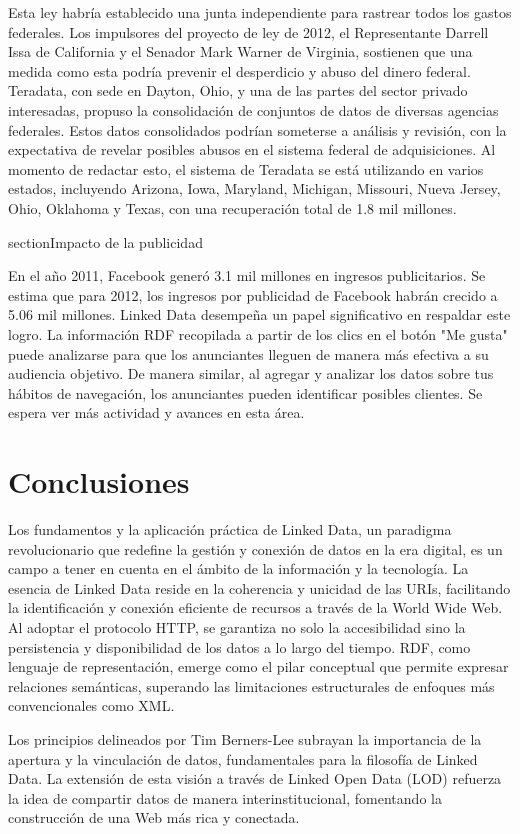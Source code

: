 \documentclass[11pt]{report}
\begin{document}
        Esta ley habría establecido una junta independiente para rastrear todos los gastos federales. Los impulsores del proyecto de ley de 2012, el Representante Darrell Issa de California y el Senador Mark Warner de Virginia, sostienen que una medida como esta podría prevenir el desperdicio y abuso del dinero federal. Teradata, con sede en Dayton, Ohio, y una de las partes del sector privado interesadas, propuso la consolidación de conjuntos de datos de diversas agencias federales. Estos datos consolidados podrían someterse a análisis y revisión, con la expectativa de revelar posibles abusos en el sistema federal de adquisiciones. Al momento de redactar esto, el sistema de Teradata se está utilizando en varios estados, incluyendo Arizona, Iowa, Maryland, Michigan, Missouri, Nueva Jersey, Ohio, Oklahoma y Texas, con una recuperación total de 1.8 mil millones.

section{Impacto de la publicidad}

		En el año 2011, Facebook generó 3.1 mil millones en ingresos publicitarios. Se estima que para 2012, los ingresos por publicidad de Facebook habrán crecido a 5.06 mil millones. Linked Data desempeña un papel significativo en respaldar este logro. La información RDF recopilada a partir de los clics en el botón "Me gusta" puede analizarse para que los anunciantes lleguen de manera más efectiva a su audiencia objetivo. De manera similar, al agregar y analizar los datos sobre tus hábitos de navegación, los anunciantes pueden identificar posibles clientes. Se espera ver más actividad y avances en esta área.

\chapter{Conclusiones}
Los fundamentos y la aplicación práctica de Linked Data, un paradigma revolucionario que redefine la gestión y conexión de datos en la era digital, es un campo a tener en cuenta en el ámbito de la información y la tecnología. La esencia de Linked Data reside en la coherencia y unicidad de las URIs, facilitando la identificación y conexión eficiente de recursos a través de la World Wide Web. Al adoptar el protocolo HTTP, se garantiza no solo la accesibilidad sino la persistencia y disponibilidad de los datos a lo largo del tiempo. RDF, como lenguaje de representación, emerge como el pilar conceptual que permite expresar relaciones semánticas, superando las limitaciones estructurales de enfoques más convencionales como XML.

Los principios delineados por Tim Berners-Lee subrayan la importancia de la apertura y la vinculación de datos, fundamentales para la filosofía de Linked Data. La extensión de esta visión a través de Linked Open Data (LOD) refuerza la idea de compartir datos de manera interinstitucional, fomentando la construcción de una Web más rica y conectada.
\end{document}
